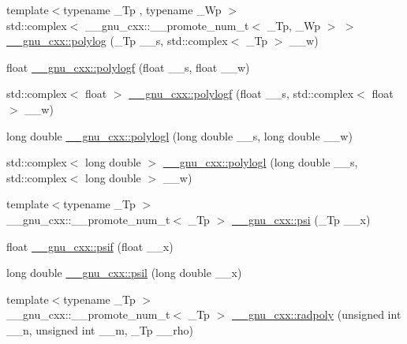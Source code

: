 \begin{DoxyCompactItemize}
\item 
{\footnotesize template$<$typename \+\_\+\+Tp , typename \+\_\+\+Wp $>$ }\\std\+::complex$<$ \+\_\+\+\_\+gnu\+\_\+cxx\+::\+\_\+\+\_\+promote\+\_\+num\+\_\+t$<$ \+\_\+\+Tp, \+\_\+\+Wp $>$ $>$ \hyperlink{group__gnu__math__spec__func_ga2789ccca20a89af26d1bcdf4f9a2c400}{\+\_\+\+\_\+gnu\+\_\+cxx\+::polylog} (\+\_\+\+Tp \+\_\+\+\_\+s, std\+::complex$<$ \+\_\+\+Tp $>$ \+\_\+\+\_\+w)
\item 
float \hyperlink{group__gnu__math__spec__func_ga5bcdd35473144a6d8efc258a79bc82d8}{\+\_\+\+\_\+gnu\+\_\+cxx\+::polylogf} (float \+\_\+\+\_\+s, float \+\_\+\+\_\+w)
\item 
std\+::complex$<$ float $>$ \hyperlink{group__gnu__math__spec__func_ga5376edb72358b777035a78b929deb49f}{\+\_\+\+\_\+gnu\+\_\+cxx\+::polylogf} (float \+\_\+\+\_\+s, std\+::complex$<$ float $>$ \+\_\+\+\_\+w)
\item 
long double \hyperlink{group__gnu__math__spec__func_ga3aa007b4b4e345c30be015ab145d5598}{\+\_\+\+\_\+gnu\+\_\+cxx\+::polylogl} (long double \+\_\+\+\_\+s, long double \+\_\+\+\_\+w)
\item 
std\+::complex$<$ long double $>$ \hyperlink{group__gnu__math__spec__func_ga9eb79e506eda210610bc59c1912b4d0f}{\+\_\+\+\_\+gnu\+\_\+cxx\+::polylogl} (long double \+\_\+\+\_\+s, std\+::complex$<$ long double $>$ \+\_\+\+\_\+w)
\item 
{\footnotesize template$<$typename \+\_\+\+Tp $>$ }\\\+\_\+\+\_\+gnu\+\_\+cxx\+::\+\_\+\+\_\+promote\+\_\+num\+\_\+t$<$ \+\_\+\+Tp $>$ \hyperlink{group__gnu__math__spec__func_ga850cdad2e428a553e5adf2474a6a385a}{\+\_\+\+\_\+gnu\+\_\+cxx\+::psi} (\+\_\+\+Tp \+\_\+\+\_\+x)
\item 
float \hyperlink{group__gnu__math__spec__func_ga47ae74abfaa3f549eed4a87b1b63449d}{\+\_\+\+\_\+gnu\+\_\+cxx\+::psif} (float \+\_\+\+\_\+x)
\item 
long double \hyperlink{group__gnu__math__spec__func_gaaf230aedcb20a1c5a43fc71132bb0dc1}{\+\_\+\+\_\+gnu\+\_\+cxx\+::psil} (long double \+\_\+\+\_\+x)
\item 
{\footnotesize template$<$typename \+\_\+\+Tp $>$ }\\\+\_\+\+\_\+gnu\+\_\+cxx\+::\+\_\+\+\_\+promote\+\_\+num\+\_\+t$<$ \+\_\+\+Tp $>$ \hyperlink{group__gnu__math__spec__func_ga2a415dff236d6e4c36150bd5958eaf78}{\+\_\+\+\_\+gnu\+\_\+cxx\+::radpoly} (unsigned int \+\_\+\+\_\+n, unsigned int \+\_\+\+\_\+m, \+\_\+\+Tp \+\_\+\+\_\+rho)
\item 

\end{DoxyCompactItemize}
